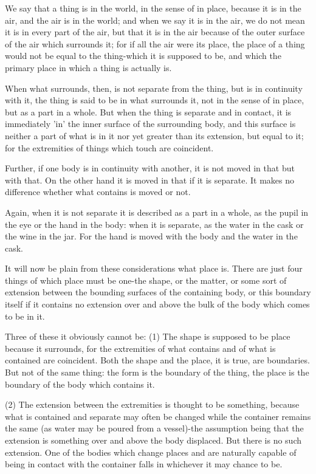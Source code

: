 We say that a thing is in the world, in the sense of in place, because
it is in the air, and the air is in the world; and when we say it
is in the air, we do not mean it is in every part of the air, but
that it is in the air because of the outer surface of the air which
surrounds it; for if all the air were its place, the place of a thing
would not be equal to the thing-which it is supposed to be, and which
the primary place in which a thing is actually is. 

When what surrounds, then, is not separate from the thing, but is
in continuity with it, the thing is said to be in what surrounds it,
not in the sense of in place, but as a part in a whole. But when the
thing is separate and in contact, it is immediately 'in' the inner
surface of the surrounding body, and this surface is neither a part
of what is in it nor yet greater than its extension, but equal to
it; for the extremities of things which touch are coincident.

Further, if one body is in continuity with another, it is not moved
in that but with that. On the other hand it is moved in that if it
is separate. It makes no difference whether what contains is moved
or not. 

Again, when it is not separate it is described as a part in a whole,
as the pupil in the eye or the hand in the body: when it is separate,
as the water in the cask or the wine in the jar. For the hand is moved
with the body and the water in the cask. 

It will now be plain from these considerations what place is. There
are just four things of which place must be one-the shape, or the
matter, or some sort of extension between the bounding surfaces of
the containing body, or this boundary itself if it contains no extension
over and above the bulk of the body which comes to be in it.

Three of these it obviously cannot be: 
(1) The shape is supposed to be place because it surrounds, for the
extremities of what contains and of what is contained are coincident.
Both the shape and the place, it is true, are boundaries. But not
of the same thing: the form is the boundary of the thing, the place
is the boundary of the body which contains it. 

(2) The extension between the extremities is thought to be something,
because what is contained and separate may often be changed while
the container remains the same (as water may be poured from a vessel)-the
assumption being that the extension is something over and above the
body displaced. But there is no such extension. One of the bodies
which change places and are naturally capable of being in contact
with the container falls in whichever it may chance to be.

